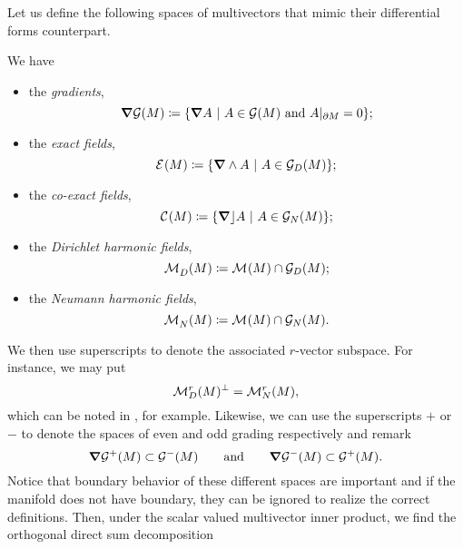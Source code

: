 Let us define the following spaces of multivectors that mimic their differential forms counterpart.
\begin{definition}
\label{def:differential_spaces}
We have
\begin{itemize}
    \item the \emph{gradients},
    \begin{equation}
    \boldsymbol{\nabla} \mathcal{G}(M) \coloneqq \{ \boldsymbol{\nabla} A ~\vert~ A \in \mathcal{G}(M) \textrm{~and~} A\vert_{\partial M} = 0\};
    \end{equation}
    \item the \emph{exact fields},
    \begin{equation}
        \mathcal{E}^{}(M)\coloneqq \{\boldsymbol{\nabla} \wedge A ~\vert~ A \in \mathcal{G}_D(M)\};
    \end{equation}
    \item the \emph{co-exact fields},
    \begin{equation}
        \mathcal{C}^{}(M)\coloneqq \{\boldsymbol{\nabla} \rfloor A ~\vert~ A \in \mathcal{G}_N(M)\};
    \end{equation}
    \item the \emph{Dirichlet harmonic fields},
    \begin{equation}
        \mathcal{M}^{}_D(M)\coloneqq \mathcal{M}^{}(M) \cap \mathcal{G}_D(M);
    \end{equation}
    \item the \emph{Neumann harmonic fields},
    \begin{equation}
        \mathcal{M}^{}_N(M)\coloneqq \mathcal{M}^{}(M) \cap \mathcal{G}_N(M).
    \end{equation}
\end{itemize}
\end{definition}
We then use superscripts to denote the associated $r$-vector subspace. For instance, we may put
\begin{equation}
\mathcal{M}^{r}_D(M)^\perp = \mathcal{M}^{r}_N(M),
\end{equation}
which can be noted in \cite{belishev_dirichlet_2008}, for example. Likewise, we can use the superscripts $+$ or $-$ to denote the spaces of even and odd grading respectively and remark
\begin{equation}
\boldsymbol{\nabla} \mathcal{G}^+(M) \subset \mathcal{G}^-(M) \qquad \textrm{and} \qquad \boldsymbol{\nabla} \mathcal{G}^-(M) \subset \mathcal{G}^+(M).
\end{equation}
Notice that boundary behavior of these different spaces are important and if the manifold does not have boundary, they can be ignored to realize the correct definitions. Then, under the scalar valued multivector inner product, we find the orthogonal direct sum decomposition
